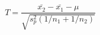 \documentclass[10pt]{article}
\begin{document}
\[T=\frac{\bar{x_2}-\bar{x_1}-\mu}{\sqrt{s_p^2(1/n_1+1/n_2)}}

\]
\end{document}
